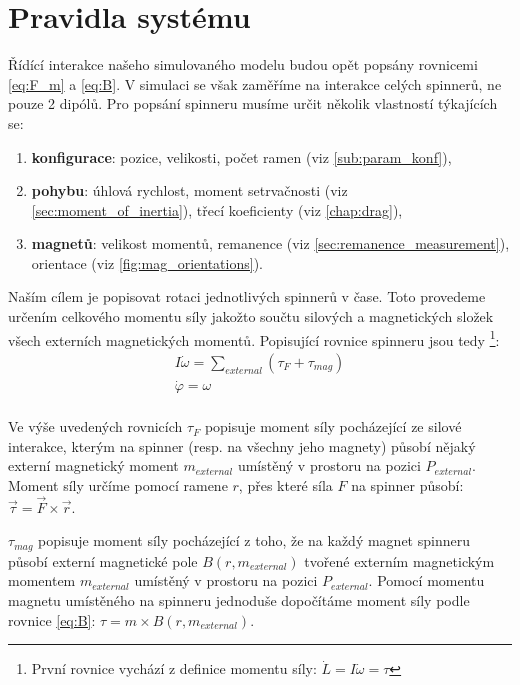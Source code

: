 \section{Pravidla systému}
Řídící interakce našeho simulovaného modelu budou opět popsány rovnicemi \ref{eq:F_m} a \ref{eq:B}. V simulaci se však zaměříme na interakce celých spinnerů, ne pouze 2 dipólů. Pro popsání spinneru musíme určit několik vlastností týkajících se:
\begin{enumerate}[topsep=0pt, partopsep=0pt]
    \setlength{\itemsep}{0pt}%
    \setlength{\parskip}{0pt}%
    \item \textbf{konfigurace}: pozice, velikosti, počet ramen (viz \autoref{sub:param_konf}),
    \item \textbf{pohybu}: úhlová rychlost, moment setrvačnosti (viz \autoref{sec:moment_of_inertia}), třecí koeficienty (viz \autoref{chap:drag}),
    \item \textbf{magnetů}: velikost momentů, remanence (viz \autoref{sec:remanence_measurement}), orientace (viz \autoref{fig:mag_orientations}).
\end{enumerate}

Naším cílem je popisovat rotaci jednotlivých spinnerů v čase. Toto provedeme určením celkového momentu síly jakožto součtu silových a magnetických složek všech externích magnetických momentů. Popisující rovnice spinneru jsou tedy \footnote{První rovnice vychází z definice momentu síly: $\dot{L} = I \dot{\omega} = \tau$}:
\begin{equation}
    \label{eq:sim_equations}
    \begin{gathered}
        I\dot{\omega} = \sum_{external} (\tau_F + \tau_{mag}) \\
        \dot{\varphi} = \omega \\
    \end{gathered}
\end{equation}

Ve výše uvedených rovnicích $\tau_F$ popisuje moment síly pocházející ze silové interakce, kterým na spinner (resp. na všechny jeho magnety) působí nějaký externí magnetický moment $m_{external}$ umístěný v prostoru na pozici $P_{external}$. Moment síly určíme pomocí ramene $r$, přes které síla $F$ na spinner působí: $\vec{\tau} = \vec{F} \times \vec{r}$.

$\tau_{mag}$ popisuje moment síly pocházející z toho, že na každý magnet spinneru působí externí magnetické pole $B(r, m_{external})$ tvořené externím magnetickým momentem $m_{external}$ umístěný v prostoru na pozici $P_{external}$. Pomocí momentu magnetu umístěného na spinneru jednoduše dopočítáme moment síly podle rovnice \ref{eq:B}: $\tau = m \times B(r, m_{external})$.

